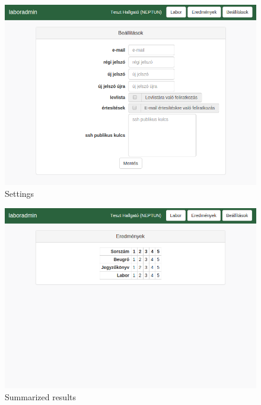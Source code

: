 \begin{figure}[!ht]
	\includegraphics[width=\textwidth]{figures/design/beallitasok.png}
	\caption{Settings}
	\label{fig:settings}
\end{figure}

\begin{figure}[!ht]
	\includegraphics[width=\textwidth]{figures/design/eredmenyek.png}
	\caption{Summarized results}
	\label{fig:results}
\end{figure}


